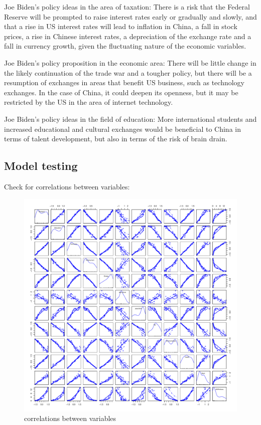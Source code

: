 \documentclass{apmcmthesis}
\begin{document}
Joe Biden's policy ideas in the area of taxation: There is a risk that the Federal Reserve will be prompted to raise interest rates early or gradually and slowly, and that a rise in US interest rates will lead to inflation in China, a fall in stock prices, a rise in Chinese interest rates, a depreciation of the exchange rate and a fall in currency growth, given the fluctuating nature of the economic variables.

Joe Biden's policy proposition in the economic area: There will be little change in the likely continuation of the trade war and a tougher policy, but there will be a resumption of exchanges in areas that benefit US business, such as technology exchanges. In the case of China, it could deepen its openness, but it may be restricted by the US in the area of internet technology.

Joe Biden's policy ideas in the field of education: More international students and increased educational and cultural exchanges would be beneficial to China in terms of talent development, but also in terms of the risk of brain drain.

\subsection{Model testing}

Check for correlations between variables:
\begin{figure}[H]
	\centering
	\includegraphics[width=\linewidth]{cor_cha2}
	\caption{correlations between variables}
\end{figure}
\end{document}
